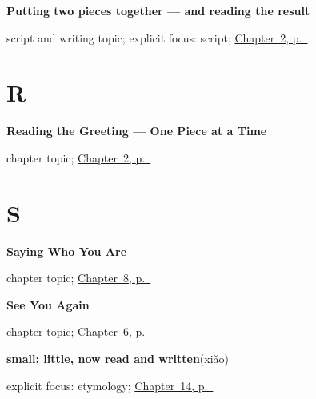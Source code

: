 \noindent\begin{minipage}[t]{\linewidth}
\raggedright
\textbf{Putting two pieces together — and reading the result}\par
\footnotesize script and writing topic; explicit focus: script; \hyperref[ch:zh-components]{Chapter~2, p.~\pageref*{ch:zh-components}}
\end{minipage}\par\smallskip

\section*{R}

\noindent\begin{minipage}[t]{\linewidth}
\raggedright
\textbf{Reading the Greeting — One Piece at a Time}\par
\footnotesize chapter topic; \hyperref[ch:zh-components]{Chapter~2, p.~\pageref*{ch:zh-components}}
\end{minipage}\par\smallskip

\section*{S}

\noindent\begin{minipage}[t]{\linewidth}
\raggedright
\textbf{Saying Who You Are}\par
\footnotesize chapter topic; \hyperref[ch:zh-mingzi]{Chapter~8, p.~\pageref*{ch:zh-mingzi}}
\end{minipage}\par\smallskip

\noindent\begin{minipage}[t]{\linewidth}
\raggedright
\textbf{See You Again}\par
\footnotesize chapter topic; \hyperref[ch:zh-zaijian]{Chapter~6, p.~\pageref*{ch:zh-zaijian}}
\end{minipage}\par\smallskip

\noindent\begin{minipage}[t]{\linewidth}
\raggedright
\textbf{small; little, now read and written}\enspace\emph{}\enspace(xiǎo)\par
\footnotesize explicit focus: etymology; \hyperref[ch:zh-primary-three]{Chapter~14, p.~\pageref*{ch:zh-primary-three}}
\end{minipage}\par\smallskip

